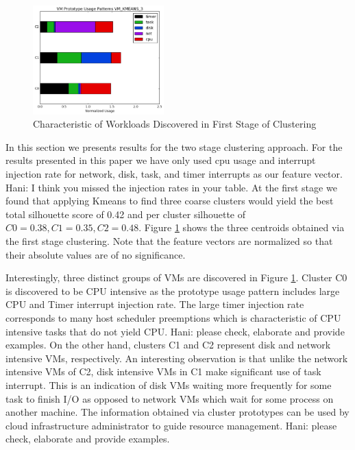 \documentclass[10pt, conference, compsocconf]{IEEEtran}
\begin{document}
\begin{figure}[!htpb]
\centering
\includegraphics[width=0.45\textwidth]{figs/VM_KMEANS_3_centroids.png}
\caption{Characteristic of Workloads Discovered in First Stage of Clustering}
\label{fig:1st-centroids}
\end{figure}
In this section we presents results for the two stage clustering approach. For the results presented in this paper we have only used cpu usage and interrupt injection rate for network, disk, task, and timer interrupts as our feature vector. {\color{red} Hani: I think you missed the injection rates in your table}. At the first stage we found that applying Kmeans to find three coarse clusters would yield the best total silhouette score of 0.42 and per cluster silhouette of $C0=0.38, C1=0.35, C2=0.48$. Figure \ref{fig:1st-centroids} shows the three centroids obtained via the first stage clustering. Note that the feature vectors are normalized so that their absolute values are of no significance. 

Interestingly, three distinct groups of VMs are discovered in Figure \ref{fig:1st-centroids}. Cluster C0 is discovered to be CPU intensive as the prototype usage pattern includes large CPU and Timer interrupt injection rate. The large timer injection rate corresponds to many host scheduler preemptions which is characteristic of CPU intensive tasks that do not yield CPU. {\color{red} Hani: please check, elaborate and provide examples.} On the other hand, clusters C1 and C2 represent disk and network intensive VMs, respectively. An interesting observation is that unlike the network intensive VMs of C2, disk intensive VMs in C1 make significant use of task interrupt. This is an indication of disk VMs waiting more frequently for some task to finish I/O as opposed to network VMs which wait for some process on another machine. The information obtained via cluster prototypes can be used by cloud infrastructure administrator to guide resource management. {\color{red} Hani: please check, elaborate and provide examples.}
\end{document}
